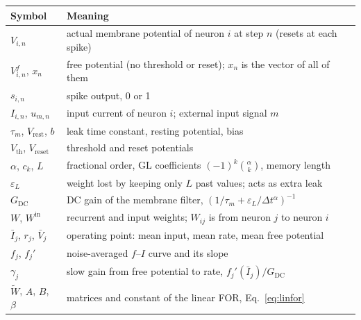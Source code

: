 \documentclass[11pt,a4paper]{article}
\newcommand{\Wt}{\tilde W}
\newcommand{\Vth}{V_{\mathrm{th}}}
\newcommand{\Vrest}{V_{\mathrm{rest}}}
\newcommand{\Vreset}{V_{\mathrm{reset}}}
\newcommand{\GDC}{G_{\mathrm{DC}}}
\begin{document}
\begin{center}
\small
\begin{tabularx}{\textwidth}{@{}l>{\raggedright\arraybackslash}X@{}}
\toprule
Symbol & Meaning \\
\midrule
$V_{i,n}$ & actual membrane potential of neuron $i$ at step $n$ (resets at each spike) \\
$V^f_{i,n}$, $x_n$ & free potential (no threshold or reset); $x_n$ is the vector of all of them \\
$s_{i,n}$ & spike output, 0 or 1 \\
$I_{i,n}$, $u_{m,n}$ & input current of neuron $i$; external input signal $m$ \\
$\tau_m$, $\Vrest$, $b$ & leak time constant, resting potential, bias \\
$\Vth$, $\Vreset$ & threshold and reset potentials \\
$\alpha$, $c_k$, $L$ & fractional order, GL coefficients $(-1)^k\binom{\alpha}{k}$, memory length \\
$\varepsilon_L$ & weight lost by keeping only $L$ past values; acts as extra leak \\
$\GDC$ & DC gain of the membrane filter, $(1/\tau_m + \varepsilon_L/\Delta t^{\alpha})^{-1}$ \\
$W$, $W^{\mathrm{in}}$ & recurrent and input weights; $W_{ij}$ is from neuron $j$ to neuron $i$ \\
$\bar I_j$, $r_j$, $\bar V_j$ & operating point: mean input, mean rate, mean free potential \\
$f_j$, $f_j'$ & noise-averaged $f$--$I$ curve and its slope \\
$\gamma_j$ & slow gain from free potential to rate, $f_j'(\bar I_j)/\GDC$ \\
$\Wt$, $A$, $B$, $\beta$ & matrices and constant of the linear FOR, Eq.~\eqref{eq:linfor} \\
\bottomrule
\end{tabularx}
\end{center}
\end{document}
